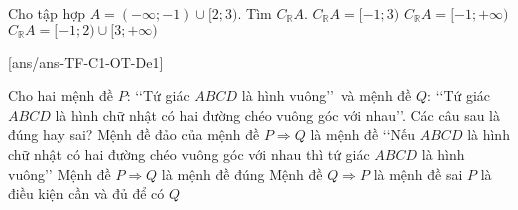 \begin{ex}%
	Cho tập hợp $A=(-\infty;-1) \cup[2; 3)$. Tìm $C_\mathbb{R} A$.
	{$C_\mathbb{R} A=[-1; 3)$}
	{$C_\mathbb{R} A=[-1;+\infty)$}
	{\True$C_\mathbb{R} A=[-1; 2) \cup[3;+\infty)$}
	\loigiai{
	Ta có $C_\mathbb{R} A=[-1; 2) \cup[3;+\infty)$.
	}
\end{ex}



\TNTF
\setcounter{ex}{0}
[ans/ans-TF-C1-OT-De1]

\begin{ex}%
	Cho hai mệnh đề $P$: \lq\lq Tứ giác $ABCD$ là hình vuông\rq\rq\ và mệnh đề $Q$: \lq\lq Tứ giác $ABCD$ là hình chữ nhật có hai đường chéo vuông góc với nhau\rq\rq. Các câu sau là đúng hay sai?
	\choiceTF
	{\True Mệnh đề đảo của mệnh đề $P \Rightarrow Q$ là mệnh đề \lq\lq Nếu $ABCD$ là hình chữ nhật có hai đường chéo vuông góc với nhau thì tứ giác $ABCD$ là hình vuông\rq\rq}
	{\True Mệnh đề $P \Rightarrow Q$ là mệnh đề đúng}
	{Mệnh đề $Q \Rightarrow P$ là mệnh đề sai}
	{\True $P$ là điều kiện cần và đủ để có $Q$}
\end{ex}

